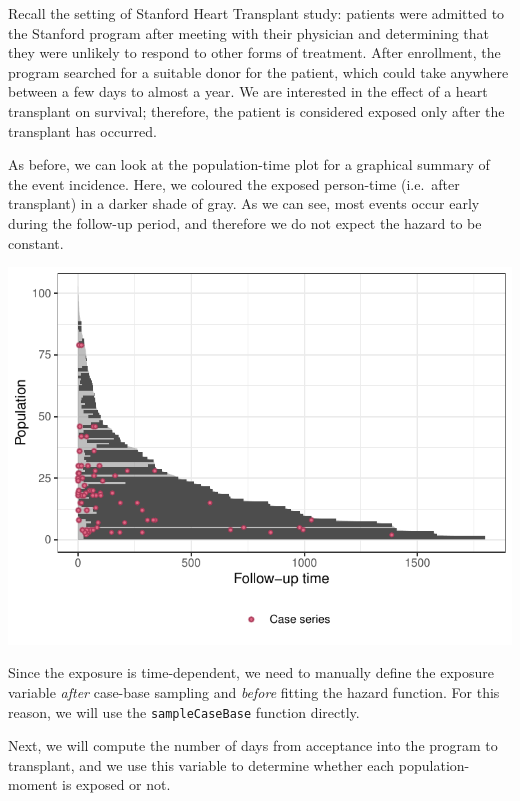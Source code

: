 \documentclass[
]{jss}
\begin{document}
Recall the setting of Stanford Heart Transplant study: patients were
admitted to the Stanford program after meeting with their physician and
determining that they were unlikely to respond to other forms of
treatment. After enrollment, the program searched for a suitable donor
for the patient, which could take anywhere between a few days to almost
a year. We are interested in the effect of a heart transplant on
survival; therefore, the patient is considered exposed only after the
transplant has occurred.

As before, we can look at the population-time plot for a graphical
summary of the event incidence. Here, we coloured the exposed
person-time (i.e.~after transplant) in a darker shade of gray. As we can
see, most events occur early during the follow-up period, and therefore
we do not expect the hazard to be constant.

\begin{CodeChunk}


\begin{center}\includegraphics{../figures/stanford-poptime-1} \end{center}

\end{CodeChunk}

Since the exposure is time-dependent, we need to manually define the
exposure variable \emph{after} case-base sampling and \emph{before}
fitting the hazard function. For this reason, we will use the
\texttt{sampleCaseBase} function directly.

Next, we will compute the number of days from acceptance into the
program to transplant, and we use this variable to determine whether
each population-moment is exposed or not.
\end{document}
